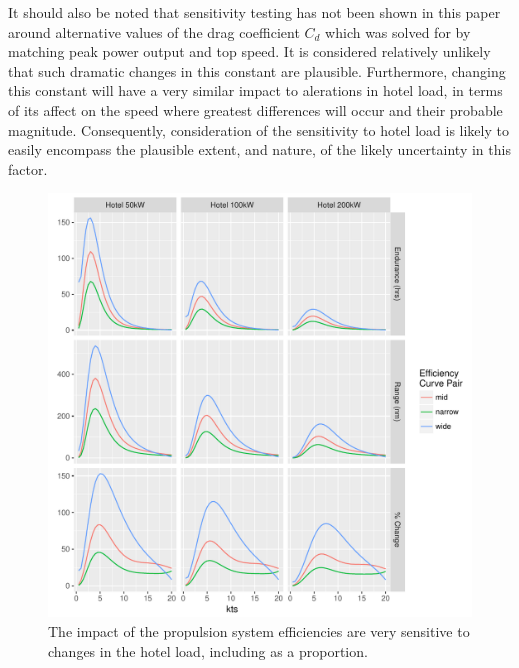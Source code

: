 \documentclass{article}\usepackage[]{graphicx}\usepackage[]{color}
\makeatletter
\def\maxwidth{ %
  \ifdim\Gin@nat@width>\linewidth
    \linewidth
  \else
    \Gin@nat@width
  \fi
}
\newenvironment{knitrout}{}{} %
\makeatother
\begin{document}
It should also be noted that sensitivity testing has not been shown in this paper around alternative values of the drag coefficient $C_d$ which was solved for by matching peak power output and top speed. It is considered relatively unlikely that such dramatic changes in this constant are plausible.  Furthermore, changing this constant will have a very similar impact to alerations in hotel load, in terms of its affect on the speed where greatest differences will occur and their probable magnitude.  Consequently, consideration of the sensitivity to hotel load is likely to easily encompass the plausible extent, and nature, of the likely uncertainty in this factor.

\begin{figure}
\begin{knitrout}
\color{fgcolor}

{\centering \includegraphics[width=\maxwidth]{figures/plots-plot_sens_hotel-1} 

}



\end{knitrout}
\caption{The impact of the propulsion system efficiencies are very sensitive to changes in the hotel load, including as a proportion.}
\label{fig:sens_hotel}
\end{figure}
\end{document}
